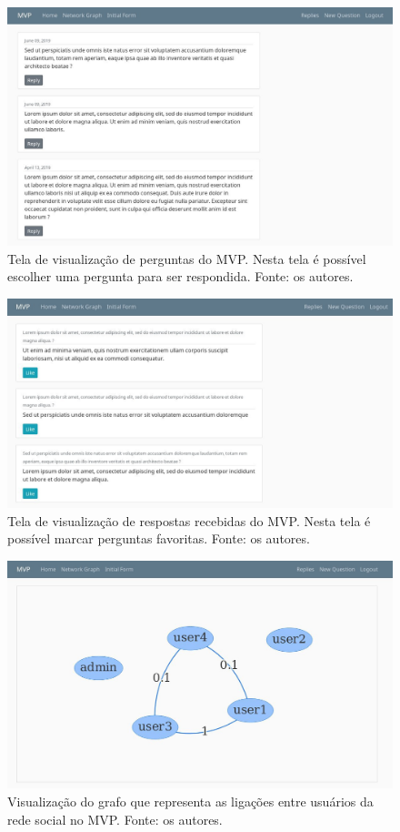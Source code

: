 \begin{figure}[!htb]
\centering
\includegraphics[width=14cm]{mvpVerQuest.png}
\caption{Tela de visualização de perguntas do MVP. Nesta tela é possível escolher uma pergunta para ser respondida. Fonte: os autores.}
\label{fig:mvpVerQuest}
\end{figure}

\begin{figure}[!htb]
\centering
\includegraphics[width=14cm]{mvpVerResp.png}
\caption{Tela de visualização de respostas recebidas do MVP. Nesta tela é possível marcar perguntas favoritas. Fonte: os autores.}
\label{fig:mvpVerResp}
\end{figure}

\begin{figure}[!htb]
\centering
\includegraphics[width=14cm]{mvpVerGrafo.png}
\caption{Visualização do grafo que representa as ligações entre usuários da rede social no MVP. Fonte: os autores.}
\label{fig:mvpVerGrafo}
\end{figure}

